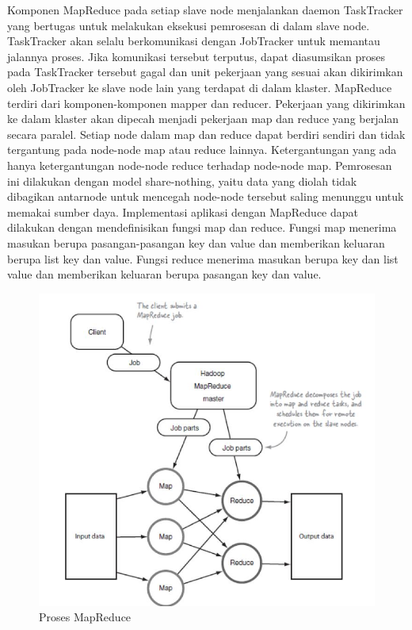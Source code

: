 \documentclass[a4paper,twoside]{article}
\begin{document}
\begin{enumerate}
{\begin{itemize}
{		Komponen MapReduce pada setiap slave node menjalankan daemon TaskTracker yang bertugas
		untuk melakukan eksekusi pemrosesan di dalam slave node. TaskTracker akan selalu 						berkomunikasi
		dengan JobTracker untuk memantau jalannya proses. Jika komunikasi tersebut terputus, dapat
		diasumsikan proses pada TaskTracker tersebut gagal dan unit pekerjaan yang sesuai akan 					dikirimkan oleh JobTracker ke slave node lain yang terdapat di dalam klaster.
		MapReduce terdiri dari komponen-komponen mapper dan reducer. Pekerjaan yang dikirimkan
		ke dalam klaster akan dipecah menjadi pekerjaan map dan reduce yang berjalan secara paralel.
		Setiap node dalam map dan reduce dapat berdiri sendiri dan tidak tergantung pada node-node 				map atau reduce lainnya. Ketergantungan yang ada hanya ketergantungan node-node reduce 					terhadap
		node-node map. Pemrosesan ini dilakukan dengan model share-nothing, yaitu data yang diolah
		tidak dibagikan antarnode untuk mencegah node-node tersebut saling menunggu untuk memakai
		sumber daya. Implementasi aplikasi dengan MapReduce dapat dilakukan dengan mendefinisikan 				fungsi 	map dan reduce. Fungsi map menerima masukan berupa pasangan-pasangan key dan value 				dan memberikan keluaran berupa list key dan value. Fungsi reduce menerima masukan berupa key 		dan list value dan memberikan keluaran berupa pasangan key dan value.
	
		\begin{figure}[H] 
		\centering  
		\includegraphics[scale=0.5]{MapReduceProses}  
		\caption[Gambar Proses MapReduce]{Proses MapReduce} 
		\label{fig:processing-events relationship} 
		\end{figure}
	
}
\end{itemize}}
\end{enumerate}
\end{document}
